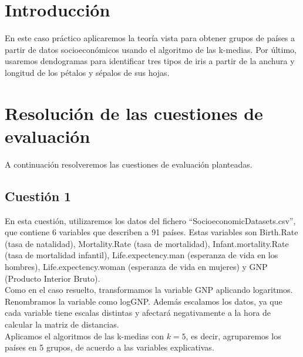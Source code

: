 \documentclass[12pt,a4paper,twoside,openright,titlepage,final]{article}
\author{José Ignacio Escribano}
\title{}
\begin{document}
\setcounter{page}{1}


\listoffigures
\thispagestyle{empty}
\newpage

\listoftables
\thispagestyle{empty}
\newpage

\tableofcontents
\thispagestyle{empty}
\newpage


\setcounter{page}{1}

\section{Introducción}

En este caso práctico aplicaremos la teoría vista para obtener grupos de países a partir de datos socioeconómicos usando el algoritmo de las k-medias. Por último, usaremos dendogramas para identificar tres tipos de iris a partir de la anchura y longitud de los pétalos y sépalos de sus hojas.

\section{Resolución de las cuestiones de evaluación}

A continuación resolveremos las cuestiones de evaluación planteadas.

\subsection{Cuestión 1}

En esta cuestión, utilizaremos los datos del fichero ``SocioeconomicDatasets.csv'', que contiene 6 variables que describen a 91 países. Estas variables son Birth.Rate (tasa de natalidad), Mortality.Rate (tasa de mortalidad), Infant.mortality.Rate (tasa de mortalidad infantil), Life.expectency.man (esperanza de vida en los hombres), Life.expectency.woman (esperanza de vida en mujeres) y GNP (Producto Interior Bruto).\\

Como en el caso resuelto, transformamos la variable GNP aplicando logaritmos. Renombramos la variable como logGNP. Además escalamos los datos, ya que cada variable tiene escalas distintas y afectará negativamente a la hora de calcular la matriz de distancias.\\

Aplicamos el algoritmos de las k-medias con $k=5$, es decir, agruparemos los países en 5 grupos, de acuerdo a las variables explicativas.\\
\end{document}
